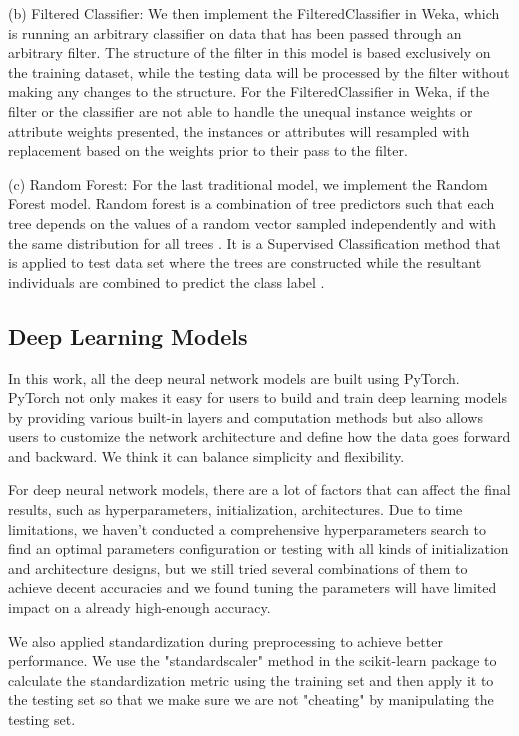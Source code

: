 \documentclass[conference]{IEEEtran}
\begin{document}
\par (b) Filtered Classifier: We then implement the FilteredClassifier in Weka, which is running an arbitrary classifier on data that has been passed through an arbitrary filter. The structure of the filter in this model is based exclusively on the training dataset, while the testing data will be processed by the filter without making any changes to the structure. For the FilteredClassifier in Weka, if the filter or the classifier are not able to handle the unequal instance weights or attribute weights presented, the instances or attributes will resampled with replacement based on the weights prior to their pass to the filter.
\par (c) Random Forest: For the last traditional model, we implement the Random Forest model. Random forest is a combination of tree predictors such that each tree depends on the values of a random vector sampled independently and with the same distribution for all trees \cite{b6}. It is a Supervised Classification method that is applied to test data set where the trees are constructed while the resultant individuals are combined to predict the class label \cite{b5}.

\subsection{Deep Learning Models}
In this work, all the deep neural network models are built using PyTorch\cite{b15}. PyTorch not only makes it easy for users to build and train deep learning models by providing various built-in layers and computation methods but also allows users to customize the network architecture and define how the data goes forward and backward. We think it can balance simplicity and flexibility. 

For deep neural network models, there are a lot of factors that can affect the final results, such as hyperparameters, initialization, architectures. Due to time limitations, we haven't conducted a comprehensive hyperparameters search to find an optimal parameters configuration or testing with all kinds of initialization and architecture designs, but we still tried several combinations of them to achieve decent accuracies and we found tuning the parameters will have limited impact on a already high-enough accuracy.

We also applied standardization during preprocessing to achieve better performance. We use the "standardscaler" method in the scikit-learn\cite{b17} package to calculate the standardization metric using the training set and then apply it to the testing set so that we make sure we are not "cheating" by manipulating the testing set.
\end{document}

